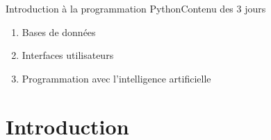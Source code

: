 \documentclass{beamer}
\begin{document}
\begin{frame}{Introduction à la programmation Python}{Contenu des 3 jours}
\begin{multicols}{3}
\begin{tiny}
\begin{enumerate}
                        \item Bases de données
                        \begin{itemize}
                        \end{itemize}

                        \item Interfaces utilisateurs
                        \begin{itemize}
                        \end{itemize}

                        \item Programmation avec l'intelligence artificielle
                    \end{enumerate}
                \end{tiny}
            \end{multicols}
    \end{frame}


    \section{Introduction}\label{sec:introduction}
\end{document}
